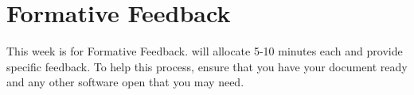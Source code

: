 
\section{Formative Feedback}
This week is for Formative Feedback. \moduleLeader will allocate 5-10 minutes each and provide specific feedback. To help this process, ensure that you have your document ready and any other software open that you may need.
